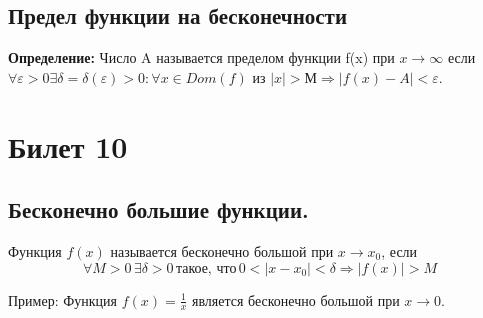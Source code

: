 \documentclass{article}
\begin{document}
\subsection*{Предел функции на бесконечности}
\textbf{Определение:} Число A называется пределом функции f(x) при $x \to \infty$ если
\(
\forall \varepsilon > 0 \exists \delta = \delta(\varepsilon) > 0 : \forall x \in Dom(f)
\) из \( |x| > М \Rightarrow |f(x) - A| < \varepsilon \).

\section{Билет 10}

\subsection*{Бесконечно большие функции.}

Функция \( f(x) \) называется бесконечно большой при \( x \to x_0 \), если
\[
\forall M > 0 \, \exists \delta > 0 \, \text{такое, что} \, 0 < |x - x_0| < \delta \Rightarrow |f(x)| > M
\]

Пример:
Функция \( f(x) = \frac{1}{x} \) является бесконечно большой при \( x \to 0 \).
\end{document}
